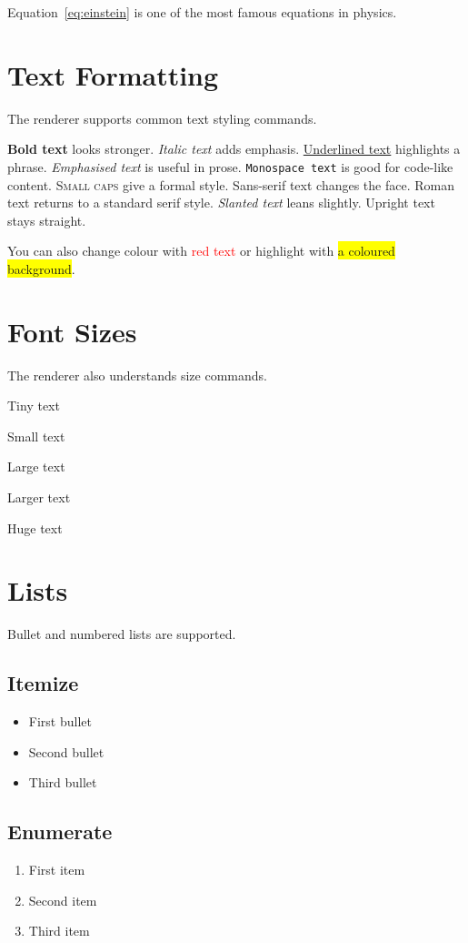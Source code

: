 \documentclass{article}
\begin{document}
Equation~\ref{eq:einstein} is one of the most famous equations in physics.

\section{Text Formatting}
The renderer supports common text styling commands.

\textbf{Bold text} looks stronger.
\textit{Italic text} adds emphasis.
\underline{Underlined text} highlights a phrase.
\emph{Emphasised text} is useful in prose.
\texttt{Monospace text} is good for code-like content.
\textsc{Small caps} give a formal style.
\textsf{Sans-serif text} changes the face.
\textrm{Roman text} returns to a standard serif style.
\textsl{Slanted text} leans slightly.
\textup{Upright text} stays straight.

You can also change colour with \textcolor{red}{red text} or highlight with \colorbox{yellow}{a coloured background}.

\section{Font Sizes}
The renderer also understands size commands.

{\tiny Tiny text}\par
{\small Small text}\par
{\large Large text}\par
{\Large Larger text}\par
{\huge Huge text}\par

\section{Lists}
Bullet and numbered lists are supported.

\subsection{Itemize}
\begin{itemize}
  \item First bullet
  \item Second bullet
  \item Third bullet
\end{itemize}

\subsection{Enumerate}
\begin{enumerate}
  \item First item
  \item Second item
  \item Third item
\end{enumerate}
\end{document}
